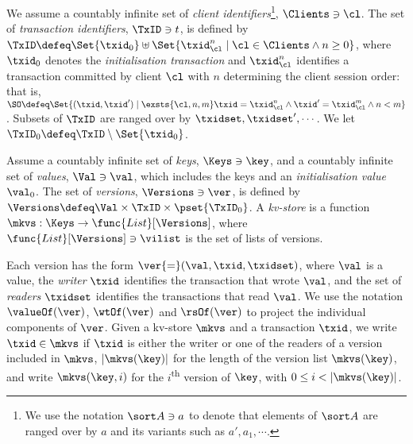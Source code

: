 We assume a countably infinite set of \emph{client identifiers}\footnote{ We use the notation
 $\sort A \ni a$ to denote that elements of $\sort A$ are ranged over
  by $a$ and its variants such as $a', a_1, \cdots$.},
$\Clients \ni \cl$.
The set of \emph{transaction identifiers}, $\TxID \ni t$, 
 is defined by
$\TxID \defeq  \Set{\txid_{0}} \uplus \Set{ \txid_{\cl}^{n} \mid \cl
  \in \Clients \land n \geq 0 }$, 
where  $\txid_0$ denotes  the  \emph{initialisation transaction}
and $\txid_{\cl}^{n}$ identifies a transaction committed by client
$\cl$ with $n$  determining  the client session order: that is, $\SO \defeq \Set{ (\txid, \txid') \mid \exsts{ \cl, n,m } \txid =
\txid_{\cl}^{n} \land \txid' = \txid_{\cl}^{m} \land n < m}$.
Subsets of $\TxID$  are ranged over by $\txidset, \txidset', \cdots$. 
We let $\TxID_{0} \defeq \TxID \setminus \Set{\txid_0}$. 

\begin{definition}[Kv-stores]
\label{def:his_heap}
\label{def:mkvs}
Assume a countably infinite set of \emph{keys}, $\Keys \ni \key$, 
and a countably infinite set of  \emph{values}, $\Val \ni \val$, 
which includes the keys and an \emph{initialisation value} $\val_0$.
The set of \emph{versions}, $\Versions \ni \ver$, is defined by $\Versions \defeq \Val \times \TxID \times \pset{\TxID_{0}}$. 
A \emph{kv-store} 
is a function $\mkvs: \Keys \to \func{List}[\Versions]$, 
where $\func{List}[\Versions] \ni \vilist$ is the set of lists of versions. %
\end{definition}

Each version has the form 
$\ver {=} (\val, \txid, \txidset)$, where $\val$ is
a value, the \emph{writer} $\txid$ identifies the transaction that
wrote $\val$,  and the set of \emph{readers} $\txidset$ identifies the
transactions that read $\val$. We use the notation 
$\valueOf(\ver)$,
$\wtOf(\ver)$ and $\rsOf(\ver)$ to project
the individual components of $\ver$.
Given a kv-store $\mkvs$ and a transaction $\txid$, we write 
$\txid \in \mkvs$ if $\txid$ 
is either the writer or 
one of the readers of a version included in $\mkvs$, 
$\lvert \mkvs(\key) \rvert$ for the length of the version
list $\mkvs(\key)$,
and write $\mkvs(\key, i)$ for the $i$\textsuperscript{th} version of $\key$, 
with $0 \leq i < \lvert \mkvs(\key) \rvert$.


